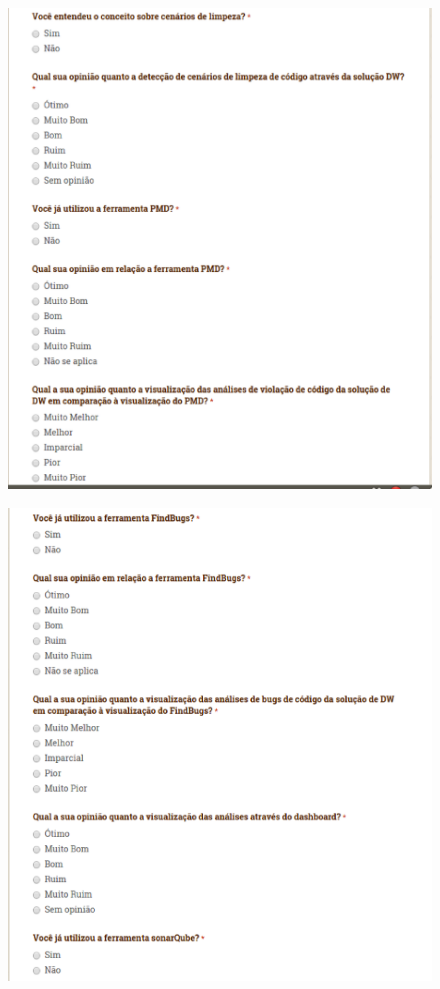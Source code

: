 \begin{apendicesenv}
\begin{figure}[h!]
\centering
\includegraphics[keepaspectratio=false,scale=0.50]{figuras/figuras_nilton/questionario2.eps}
\label{questionario2}
\end{figure}

\begin{figure}[h!]
\centering
\includegraphics[keepaspectratio=false,scale=0.50]{figuras/figuras_nilton/questionario3.eps}
\label{questionario3}
\end{figure}



\end{apendicesenv}
